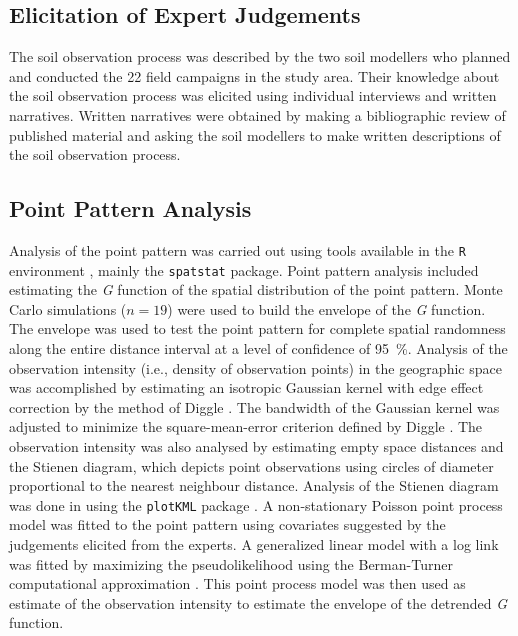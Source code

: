 \subsection{Elicitation of Expert Judgements}

The soil observation process was described by the two soil modellers who planned and conducted the 22 field 
campaigns in the study area. Their knowledge about the soil observation process was elicited using individual 
interviews and written narratives. Written narratives were obtained by making a bibliographic review of 
published material and asking the soil modellers to make written descriptions of the soil observation process.

\subsection{Point Pattern Analysis}

Analysis of the point pattern was carried out using tools available in the \texttt{R} environment 
\cite{R2013}, mainly the \texttt{spatstat} \cite{Baddeley2010} package. Point pattern analysis included 
estimating the \emph{G} function of the spatial distribution of the point pattern. Monte Carlo simulations ($n 
= 19$) were used to build the envelope of the \emph{G} function. The envelope was used to test the point 
pattern for complete spatial randomness along the entire distance interval at a level of confidence of 
\SI{95}{\percent}. Analysis of the observation intensity (i.e., density of observation points) in the 
geographic space was accomplished by estimating an isotropic Gaussian kernel with edge effect correction by the 
method of Diggle \cite{Diggle1985}. The bandwidth of the Gaussian kernel was adjusted to minimize the 
square-mean-error criterion defined by Diggle \cite{Diggle1985}. The observation intensity was also analysed by 
estimating empty space distances and the Stienen diagram, which depicts point observations using circles of 
diameter proportional to the nearest neighbour distance. Analysis of the Stienen diagram was done in 
\googleearth{} using the \texttt{plotKML} package \cite{Hengl2014}. A non-stationary Poisson point process 
model was fitted to the point pattern using covariates suggested by the judgements elicited from the experts. A 
generalized linear model with a log link was fitted by maximizing the pseudolikelihood using the Berman-Turner 
computational approximation \cite{Baddeley2010}. This point process model was then used as estimate of the 
observation intensity to estimate the envelope of the detrended \emph{G} function.

